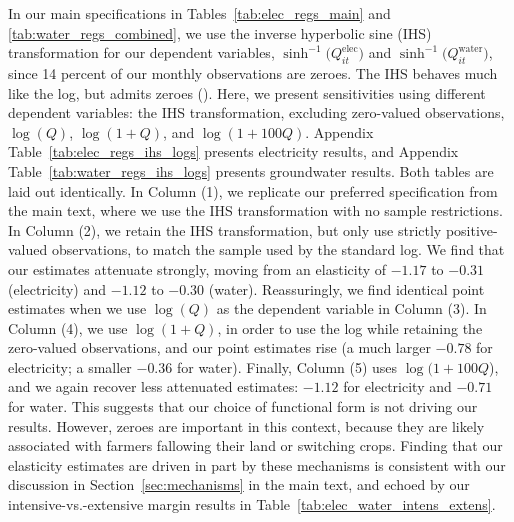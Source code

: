 In our main specifications in Tables~\ref{tab:elec_regs_main} and \ref{tab:water_regs_combined}, we use the inverse hyperbolic sine (IHS) transformation for our dependent variables, $\sinh^{-1}\big(Q^{\text{elec}}_{it}\big)$ and $\sinh^{-1}\big(Q^{\text{water}}_{it}\big)$, since 14 percent of our monthly observations are zeroes. The IHS behaves much like the log, but admits zeroes (\textcite{bellemare2020}). Here, we present sensitivities using different dependent variables: the IHS transformation, excluding zero-valued observations, $\log(Q)$, $\log(1+Q)$, and $\log(1+100Q)$. Appendix Table~\ref{tab:elec_regs_ihs_logs} presents electricity results, and Appendix Table~\ref{tab:water_regs_ihs_logs} presents groundwater results. Both tables are laid out identically. In Column (1), we replicate our preferred specification from the main text, where we use the IHS transformation with no sample restrictions. In Column (2), we retain the IHS transformation, but only use strictly positive-valued observations, to match the sample used by the standard log. We find that our estimates attenuate strongly, moving from an elasticity of $-1.17$ to $-0.31$ (electricity) and $-1.12$ to $-0.30$ (water). Reassuringly, we find identical point estimates when we use $\log(Q)$ as the dependent variable in Column (3). In Column (4), we use $\log(1+Q)$, in order to use the log while retaining the zero-valued observations, and our point estimates rise (a much larger $-0.78$ for electricity; a smaller $-0.36$ for water). Finally, Column (5) uses $\log(1+100Q$), and we again recover less attenuated estimates: $-1.12$ for electricity and $-0.71$ for water. This suggests that our choice of functional form is not driving our results. However, zeroes are important in this context, because they are likely associated with farmers fallowing their land or switching crops. Finding that our elasticity estimates are driven in part by these mechanisms is consistent with our discussion in Section~\ref{sec:mechanisms} in the main text, and echoed by our intensive-vs.-extensive margin results in Table~\ref{tab:elec_water_intens_extens}.





\FloatBarrier




